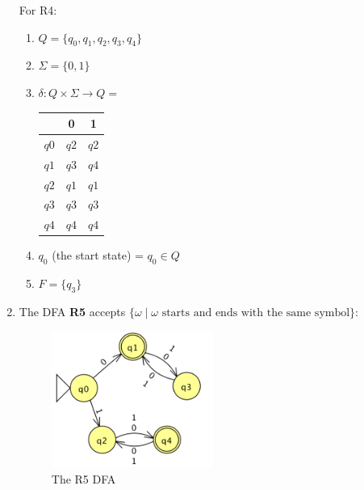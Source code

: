 \documentclass[11pt,a4paper]{article}
\begin{document}
\begin{enumerate}
                For R4:
                \begin{enumerate}
                    \item $Q = \{q_0, q_1, q_2, q_3, q_4\}$
                    \item $\Sigma = \{0, 1\}$
                    \item $\delta \colon Q \times \Sigma \rightarrow Q =$
                    \begin{tabular}{c|c|c}
                         & 0 & 1 \\ \hline
                        $q0$ & $q2$ & $q2$ \\ \hline
                        $q1$ & $q3$ & $q4$ \\ \hline
                        $q2$ & $q1$ & $q1$ \\ \hline
                        $q3$ & $q3$ & $q3$ \\ \hline
                        $q4$ & $q4$ & $q4$ \\ \hline
                    \end{tabular}
                    \item $q_0$ (the start state) = $q_0 \in Q$
                    \item $F = \{q_3\}$
                \end{enumerate}

            \item The DFA \textbf{R5} accepts $\{\omega\mid\omega\text{ starts and ends with the same symbol}\}$:\\
                \begin{figure}[H]
                    \centering
                    \includegraphics[width=0.50\textwidth]{A5}
                    \caption{The R5 DFA}
                \end{figure}


\end{enumerate}
\end{document}
